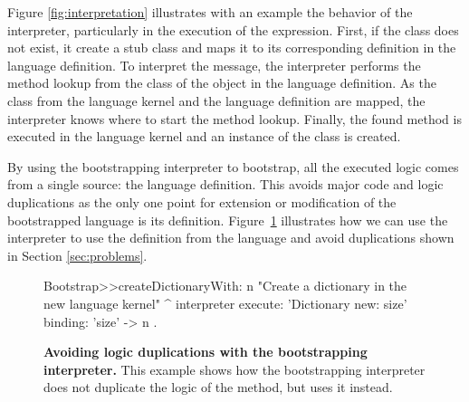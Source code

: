 Figure \ref{fig:interpretation} illustrates with an example the behavior of the interpreter, particularly in the execution of the  expression. First, if the class  does not exist, it create a stub  class and maps it to its corresponding definition in the language definition. To interpret the  message, the interpreter performs the method lookup from the class of the object in the language definition. As the class from the language kernel and the language definition are mapped, the interpreter knows where to start the method lookup. Finally, the found method is executed in the language kernel and an instance of the  class is created.



By using the bootstrapping interpreter to bootstrap, all the executed logic comes from a single source: the language definition. This avoids  major code and logic duplications as the only one point for extension or modification of the bootstrapped language is its definition. Figure~\ref{code:logic_dup3} illustrates how we can use the interpreter to use the  definition from the language and avoid duplications shown in Section \ref{sec:problems}.


\begin{figure}[ht]
\begin{code}
Bootstrap>>createDictionaryWith: n
    "Create a dictionary in the new language kernel"
    ^ interpreter
            execute: 'Dictionary new: size'
            binding: { 'size' -> n }.
\end{code}
\caption{\textbf{Avoiding logic duplications with the bootstrapping interpreter.} This example shows how the bootstrapping interpreter does not duplicate the logic of the  method, but uses it instead.\label{code:logic_dup3}}
\end{figure}


